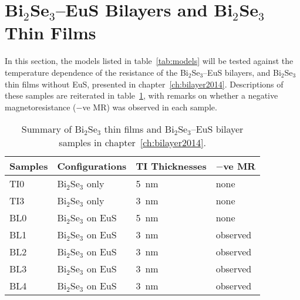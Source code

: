 \FloatBarrier%
\section{Bi$_2$Se$_3$--EuS Bilayers and Bi$_2$Se$_3$ Thin Films}
In this section, the models listed in table~\ref{tab:models} will be tested against the temperature dependence of the resistance of the Bi$_2$Se$_3$--EuS bilayers, and Bi$_2$Se$_3$ thin films without EuS, presented in chapter~\ref{ch:bilayer2014}. Descriptions of these samples are reiterated in table~\ref{tab:models_bl2014}, with remarks on whether a negative magnetoresistance ($-$ve MR) was observed in each sample.%
\begin{table}[ht]
    \centering
    \begin{tabularx}{0.75\columnwidth}[t]{l|l|l|X}
    \caption[]{\label{tab:models_bl2014}Summary of Bi$_2$Se$_3$ thin films and Bi$_2$Se$_3$--EuS bilayer samples in chapter~\ref{ch:bilayer2014}.}\\
		\hline\hline
        Samples & Configurations & TI Thicknesses & $-$ve MR\\
        \hline
        TI0 & Bi$_2$Se$_3$ only & 5~nm & none\\
        TI3 & Bi$_2$Se$_3$ only & 3~nm & none\\
        BL0 & Bi$_2$Se$_3$ on EuS & 5~nm & none\\
        BL1 & Bi$_2$Se$_3$ on EuS & 3~nm & observed\\
        BL2 & Bi$_2$Se$_3$ on EuS & 3~nm & observed\\
        BL3 & Bi$_2$Se$_3$ on EuS & 3~nm & observed\\
        BL4 & Bi$_2$Se$_3$ on EuS & 3~nm & observed\\
		\hline\hline
    \end{tabularx}
\end{table}%

